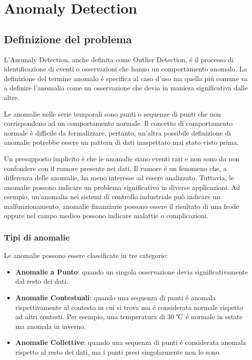 \chapter{Anomaly Detection}
\label{chap:intro}

\section{Definizione del problema}

L'Anomaly Detection, anche definita come Outlier Detection, é il processo di identificazione di eventi o osservazioni che hanno un comportamento anomalo. 
La definizione del termine anomalo é specifica al caso d'uso ma quella più comune va a definire l'anomalia come un osservazione che devia in maniera significativa dalle altre.

Le anomalie nelle serie temporali sono punti o sequenze di punti che non corrispondono ad un comportamento normale. Il concetto di comportamento normale è difficile da formalizzare, pertanto, un'altra possibile definizione di anomalie potrebbe essere un pattern di dati inaspettato mai stato visto prima.

Un presupposto implicito è che le anomalie siano eventi rari e non sono da non confondere con il rumore presente nei dati. Il rumore è un fenomeno che, a differenza delle anomalie, ha meno interesse ad essere analizzato.
Tuttavia, le anomalie possono indicare un problema significativo in diverse applicazioni. Ad esempio, un'anomalia nei sistemi di controllo industriale può indicare un malfunzionamento, anomalie finanziarie possono essere il risultato di una frode oppure nel campo medico possono indicare malattie o complicazioni.

\subsection{Tipi di anomalie}
Le anomalie possono essere classificate in tre categorie:
\begin{itemize}
	\item \textbf{Anomalie a Punto}: quando un singola osservazione devia significativamente dal resto dei dati.
	\item \textbf{Anomalie Contestuali}: quando una sequenza di punti é anomala rispettivamente al contesto in cui si trova ma é considerata normale rispetto ad altri contesti. Per esempio, una temperatura di 30 $\tccentigrade$ é normale in estate ma anomala in inverno. 
	\item \textbf{Anomalie Collettive}: quando una sequenza di punti é considerata anomala rispetto al resto dei dati, ma i punti presi singolarmente non lo sono.
\end{itemize}


